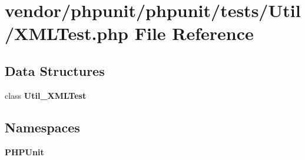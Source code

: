 \section{vendor/phpunit/phpunit/tests/\+Util/\+X\+M\+L\+Test.php File Reference}
\label{phpunit_2phpunit_2tests_2_util_2_x_m_l_test_8php}
\subsection*{Data Structures}
\begin{DoxyCompactItemize}
\item 
class {\bf Util\+\_\+\+X\+M\+L\+Test}
\end{DoxyCompactItemize}
\subsection*{Namespaces}
\begin{DoxyCompactItemize}
\item 
 {\bf P\+H\+P\+Unit}
\end{DoxyCompactItemize}
